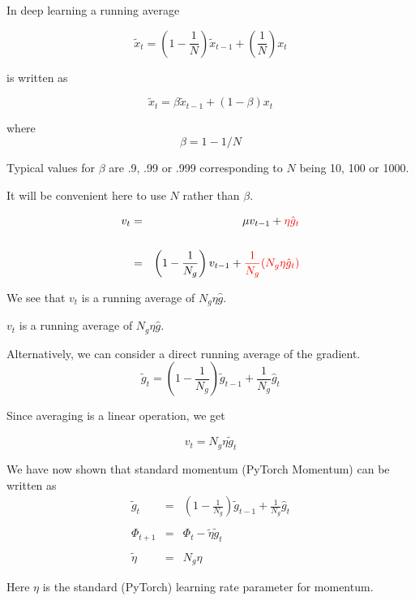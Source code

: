 {In deep learning a running average

$$\tilde{x}_t = \left(1-\frac{1}{N}\right)\tilde{x}_{t-1} + \left(\frac{1}{N}\right)x_t$$

\vfill
is written as

$$\tilde{x}_t = \beta\tilde{x}_{t-1} + (1-\beta)x_t$$

\vfill
where
$$\beta = 1 - 1/N$$

\vfill
Typical values for $\beta$ are .9, .99 or .999 corresponding to $N$ being 10, 100 or 1000.

\vfill
It will be convenient here to use $N$ rather than $\beta$.


\begin{eqnarray*}
v_t & = & \mu v_{t-1} + {\color{red} \eta \hat{g}_t} \\
\\
& = & \left(1-\frac{1}{N_g}\right) v_{t-1} + {\color{red} \frac{1}{N_g}(N_g\eta \hat{g}_t)}
\end{eqnarray*}

\vfill
We see that $v_t$ is a running average of $N_g \eta \hat{g}$.


$v_t$ is a running average of $N_g \eta \hat{g}$.

\vfill
Alternatively, we can consider a direct running average of the gradient.
$$\tilde{g}_t = \left(1-\frac{1}{N_g}\right)\tilde{g}_{t-1} + \frac{1}{N_g} \hat{g}_t$$

\vfill
Since averaging is a linear operation, we get

\vfill
{\color{red} $$v_t = N_g \eta \tilde{g}_t$$}


We have now shown that standard momentum (PyTorch Momentum) can be written as
\begin{eqnarray*}
\tilde{g}_t & = & \left(1-\frac{1}{N_g}\right)\tilde{g}_{t-1} + \frac{1}{N_g} \hat{g}_t \\
\\
\Phi_{t+1} & = &  \Phi_t - \tilde{\eta}\tilde{g}_t \\
\\
\tilde{\eta} & = & N_g\eta
\end{eqnarray*}

Here $\eta$ is the standard (PyTorch) learning rate parameter for momentum.


}
